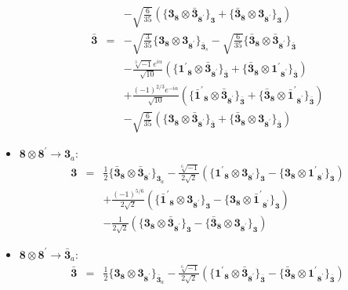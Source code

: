\documentclass[english]{article}
\newcommand{\subcg}[3]{\big\{ {#1}\otimes{#2}\big\}^{}_{#3}}
\newcommand{\rep}[1]{\mathbf{#1}}
\begin{document}
\begin{itemize}
\begin{eqnarray*}
 & & -\sqrt{\frac{6}{35}}\left(\subcg{\rep{3}_{\rep{8}}}{\rep{\bar{3}}_{\rep{8^{\prime}}}}{\rep{3}}+\subcg{\rep{\bar{3}}_{\rep{8}}}{\rep{3}_{\rep{8^{\prime}}}}{\rep{3}}\right)
\\
\rep{\bar{3}} &=& -\sqrt{\frac{3}{35}}\subcg{\rep{3}_{\rep{8}}}{\rep{3}_{\rep{8^{\prime}}}}{\rep{\bar{3}}_{s}}-\sqrt{\frac{6}{35}}\subcg{\rep{\bar{3}}_{\rep{8}}}{\rep{\bar{3}}_{\rep{8^{\prime}}}}{\rep{\bar{3}}} \\ 
 & & -\frac{\sqrt[3]{-1} e^{i \alpha }}{\sqrt{10}}\left(\subcg{\rep{1^{\prime}}_{\rep{8}}}{\rep{\bar{3}}_{\rep{8^{\prime}}}}{\rep{\bar{3}}}+\subcg{\rep{\bar{3}}_{\rep{8}}}{\rep{1^{\prime}}_{\rep{8^{\prime}}}}{\rep{\bar{3}}}\right) \\ 
 & & +\frac{(-1)^{2/3} e^{-i \alpha }}{\sqrt{10}}\left(\subcg{\rep{\bar{1}^{\prime}}_{\rep{8}}}{\rep{\bar{3}}_{\rep{8^{\prime}}}}{\rep{\bar{3}}}+\subcg{\rep{\bar{3}}_{\rep{8}}}{\rep{\bar{1}^{\prime}}_{\rep{8^{\prime}}}}{\rep{\bar{3}}}\right) \\ 
 & & -\sqrt{\frac{6}{35}}\left(\subcg{\rep{3}_{\rep{8}}}{\rep{\bar{3}}_{\rep{8^{\prime}}}}{\rep{\bar{3}}}+\subcg{\rep{\bar{3}}_{\rep{8}}}{\rep{3}_{\rep{8^{\prime}}}}{\rep{\bar{3}}}\right)
\end{eqnarray*}
\item $\rep{8}\otimes\rep{8^{\prime}}\to\rep{3}_{a}$:
\begin{eqnarray*}
\rep{3} &=& \frac{1}{2}\subcg{\rep{\bar{3}}_{\rep{8}}}{\rep{\bar{3}}_{\rep{8^{\prime}}}}{\rep{3}_{a}}-\frac{\sqrt[6]{-1}}{2 \sqrt{2}}\left(\subcg{\rep{1^{\prime}}_{\rep{8}}}{\rep{3}_{\rep{8^{\prime}}}}{\rep{3}}-\subcg{\rep{3}_{\rep{8}}}{\rep{1^{\prime}}_{\rep{8^{\prime}}}}{\rep{3}}\right) \\ 
 & & +\frac{(-1)^{5/6}}{2 \sqrt{2}}\left(\subcg{\rep{\bar{1}^{\prime}}_{\rep{8}}}{\rep{3}_{\rep{8^{\prime}}}}{\rep{3}}-\subcg{\rep{3}_{\rep{8}}}{\rep{\bar{1}^{\prime}}_{\rep{8^{\prime}}}}{\rep{3}}\right) \\ 
 & & -\frac{1}{2 \sqrt{2}}\left(\subcg{\rep{3}_{\rep{8}}}{\rep{\bar{3}}_{\rep{8^{\prime}}}}{\rep{3}}-\subcg{\rep{\bar{3}}_{\rep{8}}}{\rep{3}_{\rep{8^{\prime}}}}{\rep{3}}\right)
\end{eqnarray*}
\item $\rep{8}\otimes\rep{8^{\prime}}\to\rep{\bar{3}}_{a}$:
\begin{eqnarray*}
\rep{\bar{3}} &=& \frac{1}{2}\subcg{\rep{3}_{\rep{8}}}{\rep{3}_{\rep{8^{\prime}}}}{\rep{\bar{3}}_{a}}-\frac{\sqrt[6]{-1}}{2 \sqrt{2}}\left(\subcg{\rep{1^{\prime}}_{\rep{8}}}{\rep{\bar{3}}_{\rep{8^{\prime}}}}{\rep{\bar{3}}}-\subcg{\rep{\bar{3}}_{\rep{8}}}{\rep{1^{\prime}}_{\rep{8^{\prime}}}}{\rep{\bar{3}}}\right) \\ 

\end{eqnarray*}
\end{itemize}
\end{document}

